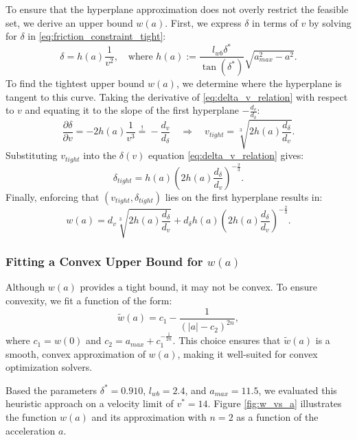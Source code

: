 To ensure that the hyperplane approximation does not overly restrict the feasible set, we derive an upper bound \( w(a) \).
First, we express \( \delta \) in terms of \( v \) by solving for \( \delta \) in \eqref{eq:friction_constraint_tight}:
\begin{equation}
	\label{eq:delta_v_relation}
	\delta = h(a) \frac{1}{v^2},
	\quad \text{where } h(a) := \frac{l_{wb} \delta^*}{\tan(\delta^*)} \sqrt{a_{max}^2 - a^2}.
\end{equation}
To find the tightest upper bound \( w(a) \), we determine where the hyperplane is tangent to this curve.
Taking the derivative of \eqref{eq:delta_v_relation} with respect to $v$ and equating it to the slope of the first hyperplane $-\frac{d_v}{d_\delta}$:
\begin{equation}
	\frac{\partial\delta}{\partial v} = -2 h(a) \frac{1}{v^3} \overset{!}{=} -\frac{d_v}{d_\delta} \quad \Rightarrow \quad v_{tight} = \sqrt[3]{2h(a)\frac{d_\delta}{d_v}}.
\end{equation}
Substituting $v_{tight}$ into the \( \delta(v) \) equation \eqref{eq:delta_v_relation} gives:
\begin{equation}
	\delta_{tight} = h(a) \left(2h(a)\frac{d_\delta}{d_v}\right)^{-\frac{2}{3}}.
\end{equation}
Finally, enforcing that \( (v_{tight}, \delta_{tight}) \) lies on the first hyperplane results in:
\begin{equation}
	w(a) = d_v \sqrt[3]{2h(a)\frac{d_\delta}{d_v}} + d_\delta h(a) \left(2h(a)\frac{d_\delta}{d_v}\right)^{-\frac{2}{3}}.
\end{equation}

\subsubsection{Fitting a Convex Upper Bound for \( w(a) \)}

Although \( w(a) \) provides a tight bound, it may not be convex.
To ensure convexity, we fit a function of the form:
\begin{equation}
	\tilde{w}(a) = c_1 - \frac{1}{(|a| - c_2)^{2n}},
	\label{eq:fitting_irrational}
\end{equation}
where \( c_1 = w(0) \) and \( c_2 = a_{max} + c_1^{-\frac{1}{2n}} \).
This choice ensures that \( \tilde{w}(a) \) is a smooth, convex approximation of \( w(a) \), making it well-suited for convex optimization solvers.

Based the parameters $\delta^*=0.910$, $l_{wb}=2.4$, and $a_{max}=11.5$, we evaluated this heuristic approach on a velocity limit of $v^*=14$.
Figure \ref{fig:w_vs_a} illustrates the function $w(a)$ and its approximation with $n=2$ as a function of the acceleration $a$.

